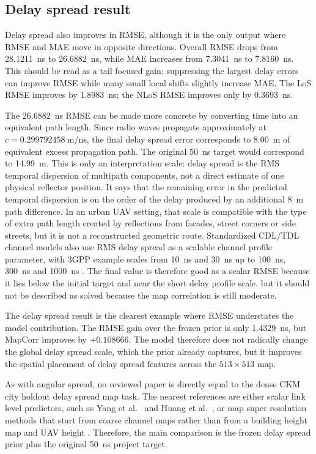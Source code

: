 \subsection{Delay spread result}

Delay spread also improves in RMSE, although it is the only output where RMSE
and MAE move in opposite directions. Overall RMSE drops from \SI{28.1211}{ns}
to \SI{26.6882}{ns}, while MAE increases from \SI{7.3041}{ns} to
\SI{7.8160}{ns}. This should be read as a tail focused gain: suppressing the
largest delay errors can improve RMSE while many small local shifts slightly
increase MAE. The LoS RMSE improves by \SI{1.8983}{ns}; the NLoS RMSE improves
only by \SI{0.3693}{ns}.

The \SI{26.6882}{ns} RMSE can be made more concrete by converting time into an
equivalent path length. Since radio waves propagate approximately at
\(c=0.299792458~\mathrm{m/ns}\), the final delay spread error corresponds to
\SI{8.00}{m} of equivalent excess propagation path. The original
\SI{50}{ns} target would correspond to \SI{14.99}{m}. This is only an
interpretation scale: delay spread is the RMS temporal dispersion of
multipath components, not a direct estimate of one physical reflector position.
It says that the remaining error in the predicted temporal dispersion is on the
order of the delay produced by an additional \SI{8}{m} path difference. In an
urban UAV setting, that scale is compatible with the type of extra path length
created by reflections from facades, street corners or side streets, but it is
not a reconstructed geometric route. Standardized CDL/TDL channel models also
use RMS delay spread as a scalable channel profile parameter, with 3GPP example
scales from \SI{10}{ns} and \SI{30}{ns} up to \SI{100}{ns}, \SI{300}{ns} and
\SI{1000}{ns} \cite{tr38901}. The final value is therefore good as a scalar
RMSE because it lies below the initial target and near the short delay profile
scale, but it should not be described as solved because the map correlation is
still moderate.

The delay spread result is the clearest example where RMSE understates the
model contribution. The RMSE gain over the frozen prior is only
\SI{1.4329}{ns}, but MapCorr improves by \(+0.108666\). The model therefore
does not radically change the global delay spread scale, which the prior
already captures, but it improves the spatial placement of delay spread
features across the \(513\times513\) map.

As with angular spread, no reviewed paper is directly equal to the dense CKM
city holdout delay spread map task. The nearest references are either scalar
link level predictors, such as Yang et al.\ \cite{yang2019a2gml} and Huang
et al.\ \cite{huang2025a2gtransformer}, or map super resolution methods that
start from coarse channel maps rather than from a building height map and UAV
height \cite{wang2023multitasksr}. Therefore, the main comparison is the
frozen delay spread prior plus the original \SI{50}{ns} project target.

